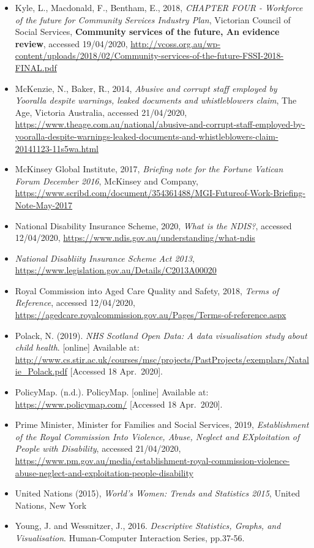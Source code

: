 \documentclass[
  11pt,
]{article}
\begin{document}
\begin{itemize}
\item
  Kyle, L., Macdonald, F., Bentham, E., 2018, \emph{CHAPTER FOUR - Workforce of the future for Community Services Industry Plan}, Victorian Council of Social Services, \textbf{Community services of the future, An evidence review}, accessed 19/04/2020, \url{http://vcoss.org.au/wp-content/uploads/2018/02/Community-services-of-the-future-FSSI-2018-FINAL.pdf}
\item
  McKenzie, N., Baker, R., 2014, \emph{Abusive and corrupt staff employed by Yooralla despite warnings, leaked documents and whistleblowers claim}, The Age, Victoria Australia, accessed 21/04/2020, \url{https://www.theage.com.au/national/abusive-and-corrupt-staff-employed-by-yooralla-despite-warnings-leaked-documents-and-whistleblowers-claim-20141123-11s5wa.html}
\item
  McKinsey Global Institute, 2017, \emph{Briefing note for the Fortune Vatican Forum December 2016}, McKinsey and Company, \url{https://www.scribd.com/document/354361488/MGI-Futureof-Work-Briefing-Note-May-2017}
\item
  National Disability Insurance Scheme, 2020, \emph{What is the NDIS?}, accessed 12/04/2020, \url{https://www.ndis.gov.au/understanding/what-ndis}
\item
  \emph{National Disabliity Insurance Scheme Act 2013}, \url{https://www.legislation.gov.au/Details/C2013A00020}
\item
  Royal Commission into Aged Care Quality and Safety, 2018, \emph{Terms of Reference}, accessed 12/04/2020, \url{https://agedcare.royalcommission.gov.au/Pages/Terms-of-reference.aspx}
\item
  Polack, N. (2019). \emph{NHS Scotland Open Data: A data visualisation study about child health}. {[}online{]} Available at: \url{http://www.cs.stir.ac.uk/courses/msc/projects/PastProjects/exemplars/Natalie_Polack.pdf} {[}Accessed 18 Apr.~2020{]}.
\item
  PolicyMap. (n.d.). PolicyMap. {[}online{]} Available at: \url{https://www.policymap.com/} {[}Accessed 18 Apr.~2020{]}.
\item
  Prime Minister, Minister for Families and Social Services, 2019, \emph{Establishment of the Royal Commission Into Violence, Abuse, Neglect and EXploitation of People with Disability}, accessed 21/04/2020, \url{https://www.pm.gov.au/media/establishment-royal-commission-violence-abuse-neglect-and-exploitation-people-disability}
\item
  United Nations (2015), \emph{World's Women: Trends and Statistics 2015}, United Nations, New York
\item
  Young, J. and Wessnitzer, J., 2016. \emph{Descriptive Statistics, Graphs, and Visualisation}. Human-Computer Interaction Series, pp.37-56.
\end{itemize}
\end{document}
